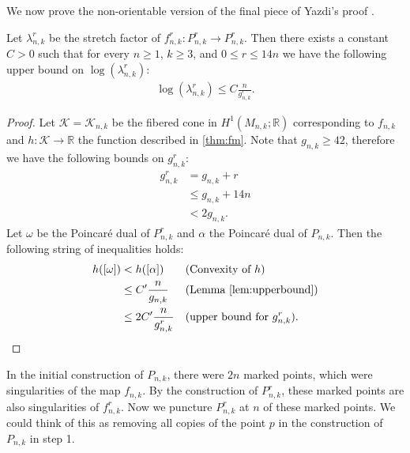 We now prove the non-orientable version of the final piece of Yazdi's proof \cite[Lemma 3.6]{yazdi2018pseudo}.
\begin{lem}
\label{lem:bound}
Let $\lambda_{n,k}^r$ be the stretch factor of $f_{n,k}^r:P_{n,k}^r\rightarrow P_{n,k}^r$. Then there exists a constant $C > 0$ such that for every $n \geq 1$, $k \geq 3$, and $0 \leq r \leq 14n$ we have the following upper bound on $\log(\lambda_{n,k}^r)$:
\begin{align*}
  \log(\lambda^r_{n,k}) \leq C\frac{n}{g^r_{n,k}}.
\end{align*}
\end{lem}
\begin{proof}
  Let $\mathcal{K} = \mathcal{K}_{n,k}$ be the fibered cone in $H^1(M_{n,k};\mathbb{R})$ corresponding to $f_{n,k}$ and $h: \mathcal{K} \xrightarrow[]{} \mathbb{R}$
  the function described in \autoref{thm:fm}. Note that $g_{n,k}\geq 42$, therefore we have the following bounds on $g_{n,k}^r$:
  \begin{align*}
    g^r_{n,k} &= g_{n,k} + r \\
              &\leq g_{n,k} + 14n \\
              &< 2g_{n,k}.
  \end{align*}
  Let $\omega$ be the Poincar\'e dual of $P^r_{n,k}$ and $\alpha$ the Poincar\'e dual of $P_{n,k}$.  Then the following string of inequalities holds:
  \begin{align*}
    h([\omega]) &< h([\alpha]) &&\text{(Convexity of $h$)}\\
                &\leq C'\frac{n}{g_{n,k}} &&\text{(Lemma \ref{lem:upperbound})}\\
                &\leq 2C'\frac{n}{g^r_{n,k}}&&\text{(upper bound for $g_{n,k}^r$)}. 
  \end{align*}
\end{proof}


In the initial construction of $P_{n,k}$, there were $2n$  marked points, which were singularities of the map $f_{n,k}$.  By the construction of $P_{n,k}^r$, these marked points are also singularities of $f^r_{n,k}$.  Now we puncture $P_{n,k}^r$ at $n$ of these marked points.  We could think of this as removing all copies of the point $p$ in the construction of $P_{n,k}$ in step 1. %

